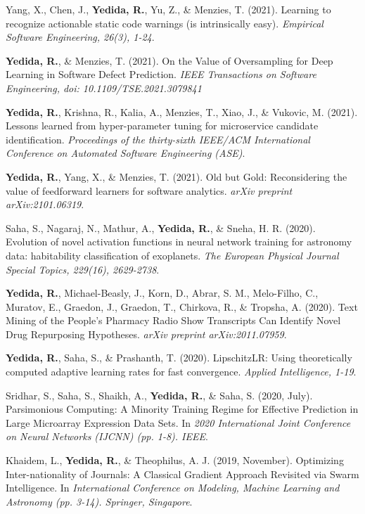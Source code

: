     \item
      {Yang, X., Chen, J., \textbf{Yedida, R.}, Yu, Z., \& Menzies, T. (2021). Learning to recognize actionable static code warnings (is intrinsically easy). \textit{Empirical Software Engineering, 26(3), 1-24}.}
    \item
      {\textbf{Yedida, R.}, \& Menzies, T. (2021). On the Value of Oversampling for Deep Learning in Software Defect Prediction. \textit{IEEE Transactions on Software Engineering, doi: 10.1109/TSE.2021.3079841}}
    \item
      {\textbf{Yedida, R.}, Krishna, R., Kalia, A., Menzies, T., Xiao, J., \& Vukovic, M. (2021). Lessons learned from hyper-parameter tuning for microservice candidate identification. \textit{Proceedings of the thirty-sixth IEEE/ACM International Conference on Automated Software Engineering (ASE)}.
      }
    \item
      {\textbf{Yedida, R.}, Yang, X., \& Menzies, T. (2021). Old but Gold: Reconsidering the value of feedforward learners for software analytics. \textit{arXiv preprint arXiv:2101.06319}.}
    \item
      {Saha, S., Nagaraj, N., Mathur, A., \textbf{Yedida, R.}, \& Sneha, H. R. (2020). Evolution of novel activation functions in neural network training for astronomy data: habitability classification of exoplanets. \textit{The European Physical Journal Special Topics, 229(16), 2629-2738}.}
    \item
      {\textbf{Yedida, R.}, Michael-Beasly, J., Korn, D., Abrar, S. M., Melo-Filho, C., Muratov, E., Graedon, J., Graedon, T., Chirkova, R., \& Tropsha, A. (2020). Text Mining of the People's Pharmacy Radio Show Transcripts Can Identify Novel Drug Repurposing Hypotheses. \textit{arXiv preprint arXiv:2011.07959}.}
    \item
      {\textbf{Yedida, R.}, Saha, S., \& Prashanth, T. (2020). LipschitzLR: Using theoretically computed adaptive learning rates for fast convergence. \textit{Applied Intelligence, 1-19}.}
    \item
      {Sridhar, S., Saha, S., Shaikh, A., \textbf{Yedida, R.}, \& Saha, S. (2020, July). Parsimonious Computing: A Minority Training Regime for Effective Prediction in Large Microarray Expression Data Sets. In \textit{2020 International Joint Conference on Neural Networks (IJCNN) (pp. 1-8). IEEE}.}
    \item
      {Khaidem, L., \textbf{Yedida, R.}, \& Theophilus, A. J. (2019, November). Optimizing Inter-nationality of Journals: A Classical Gradient Approach Revisited via Swarm Intelligence. In \textit{International Conference on Modeling, Machine Learning and Astronomy (pp. 3-14). Springer, Singapore}.}
 \resumeSubHeadingListEnd